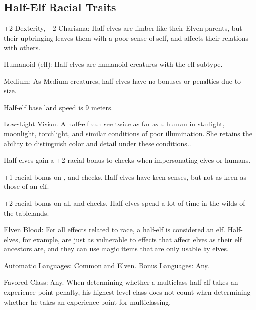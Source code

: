 \subsection{Half-Elf Racial Traits}
\begin{itemize*}
    \item +2 Dexterity, $-2$ Charisma: Half-elves are limber like their Elven parents, but their upbringing leaves them with a poor sense of self, and affects their relations with others.
    \item Humanoid (elf): Half-elves are humanoid creatures with the elf subtype.
    \item Medium: As Medium creatures, half-elves have no bonuses or penalties due to size.
    \item Half-elf base land speed is 9 meters.
    \item Low-Light Vision: A half-elf can see twice as far as a human in starlight, moonlight, torchlight, and similar conditions of poor illumination. She retains the ability to distinguish color and detail under these conditions..
    \item Half-elves gain a +2 racial bonus to  checks when impersonating elves or humans.
    \item +1 racial bonus on ,  and  checks. Half-elves have keen senses, but not as keen as those of an elf.
    \item +2 racial bonus on all  and  checks. Half-elves spend a lot of time in the wilds of the tablelands.
    \item Elven Blood: For all effects related to race, a half-elf is considered an elf. Half-elves, for example, are just as vulnerable to effects that affect elves as their elf ancestors are, and they can use magic items that are only usable by elves.
    \item Automatic Languages: Common and Elven. Bonus Languages: Any.
    \item Favored Class: Any. When determining whether a multiclass half-elf takes an experience point penalty, his highest-level class does not count when determining whether he takes an experience point for multiclassing.
\end{itemize*}